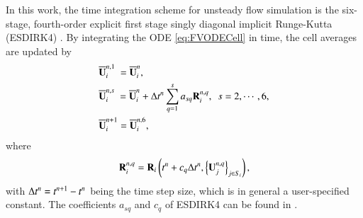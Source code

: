 {In this work, the time integration scheme for unsteady flow simulation is the six-stage, fourth-order explicit first stage singly diagonal implicit Runge-Kutta (ESDIRK4) \cite{bijl2002implicitBDFvESDIRK}. By integrating the ODE \eqref{eq:FVODECell} in time, the cell averages are updated by
\begin{subequations}\label{eq:ESDIRK4}
    \begin{align}
         & \overline{\mathbf{U}}^{n,1}_i \ = \overline{\mathbf{U}}^{n}_i, \label{eq:esdirk4-1}                                                                  \\
         & \overline{\mathbf{U}}^{n,s}_i \ = \overline{\mathbf{U}}^{n}_i + \mathrm\Delta t^n \sum_{q=1}^{s} a_{sq} \mathbf{R}_i^{n,q},\ \ s = 2, \cdots, 6, \label{eq:esdirk4-s} \\
         & \overline{\mathbf{U}}^{n+1}_i = \overline{\mathbf{U}}^{n,6}_i, \label{eq:esdirk4-6}
    \end{align}
\end{subequations}
where
\begin{equation}
    \mathbf{R}^{n,q}_i  = \mathbf{R}_i \left(t^n + c_q \mathrm\Delta t^n, \left\{\mathbf{U}^{n,q}_j\right\}_{j \in S_i}\right),
\end{equation}
with $\mathrm\Delta t^n= t^{n+1} - t^n$ being the time step size, which is in general a user-specified constant.
The coefficients $a_{sq}$ and $c_q$ of ESDIRK4 can be found
in \cite{bijl2002implicitBDFvESDIRK}.}

